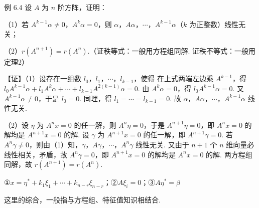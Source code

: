 \begin{fcard}{例 6.4}
设 $A$ 为 $n$ 阶方阵，证明：

（1）若 $A^{k-1}\alpha\ne0$，$A^k\alpha=0$，则 $\alpha$，$A\alpha$，$\cdots$，$A^{k-1}\alpha$（$k$ 为正整数）线性无关；

（2）$r(A^{n+1})=r(A^n)$.（证秩等式：一般用方程组同解. 证秩不等式：一般用定理2）

【证】（1）设存在一组数 $l_0$，$l_1$，$\cdots$，$l_{k-1}$，使得
在上式两端左边乘 $A^{k-1}$，得 $l_0A^{k-1}\alpha+l_1A^k\alpha+\cdots+l_{k-1}A^{2(k-1)}\alpha=0$. 由 $A^k\alpha=0$，得 $l_0A^{k-1}\alpha=0$. 又 $A^{k-1}\alpha\ne0$，于是 $l_0=0$. 同理，得 $l_1=\cdots=l_{k-1}=0$. 故 $\alpha$，$A\alpha$，$\cdots$，$A^{k-1}\alpha$ 线性无关.


（2）设 $\eta$ 为 $A^n x=0$ 的任一解，则 $A^n\eta=0$，于是 $A^{n+1}\eta=0$，即 $A^n x=0$ 的解均是 $A^{n+1}x=0$ 的解. 设 $\gamma$ 为 $A^{n+1}x=0$ 的任一解，即 $A^{n+1}\gamma=0$. 若 $A^n\gamma\ne0$，则由（1）知，$\gamma$，$A\gamma$，$\cdots$，$A^n\gamma$ 线性无关. 又由于 $n+1$ 个 $n$ 维向量必线性相关，矛盾，故 $A^n\gamma=0$，即 $A^{n+1}x=0$ 的解均是 $A^n x=0$ 的解. 两方程组同解，故 $r(A^{n+1})=r(A^n)$.
\end{fcard}



①$x=\eta^{*}+k_1\xi_1+\cdots+k_{n-r}\xi_{n-r}$；②$A\xi_i=0$；③$A\eta^{*}=\beta$

这里的综合，一般指与方程组、特征值知识相结合.

